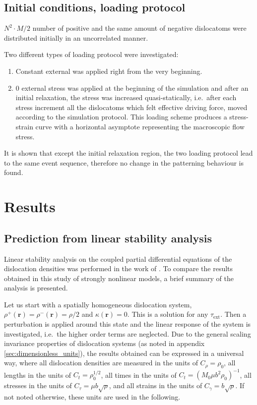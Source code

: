 \subsection{Initial conditions, loading protocol}
${N^2} \cdot M/2$ number of positive and the same amount of negative dislocatoms were distributed initially in an uncorrelated manner.

Two different types of loading protocol were investigated:
\begin{enumerate}
\item Constant external was applied right from the very beginning.
\item $0$ external stress was applied at the beginning of the simulation and after an initial relaxation, the stress was increased quasi-statically, i.e.\ after each stress increment all the dislocatoms which felt effective driving force, moved according to the simulation protocol. This loading scheme produces a stress-strain curve with a horizontal asymptote representing the macroscopic flow stress.  
\end{enumerate}
It is shown that except the initial relaxation region, the two loading protocol lead to the same event sequence, therefore no change in the patterning behaviour is found.

\section{Results}
\subsection{Prediction from linear stability analysis}
Linear stability analysis on the coupled partial differential equations of the dislocation densities was performed in the work of \citet{PhysRevB.93.214110}. To compare the results obtained in this study of strongly nonlinear models, a brief summary of the analysis is presented.

Let us start with a spatially homogeneous dislocation system, ${\rho ^ + }\left( {\mathbf{r}} \right) = {\rho ^ - }\left( {\mathbf{r}} \right) = \rho /2$ and $\kappa \left( {\mathbf{r}} \right) = 0$. This is a solution for any ${\tau _{{\text{ext}}}}$. Then a perturbation is applied around this state and the linear response of the system is investigated, i.e.\ the higher order terms are neglected. Due to the general scaling invariance properties of dislocation systems (as noted in appendix \ref{sec:dimensionless_units}), the results obtained can be expressed in a universal way, where all dislocation densities are measured in the units of ${C_\rho } = {\rho _0}$, all lengths in the units of ${C_t} = \rho _0^{1/2}$, all times in the units of ${C_t} = {\left( {{M_0}\mu {b^2}{\rho _0}} \right)^{ - 1}}$, all stresses in the units of ${C_\tau } = \mu b\sqrt \rho  $, and all strains in the units of ${C_\gamma } = b\sqrt \rho  $. If not noted otherwise, these units are used in the following.

